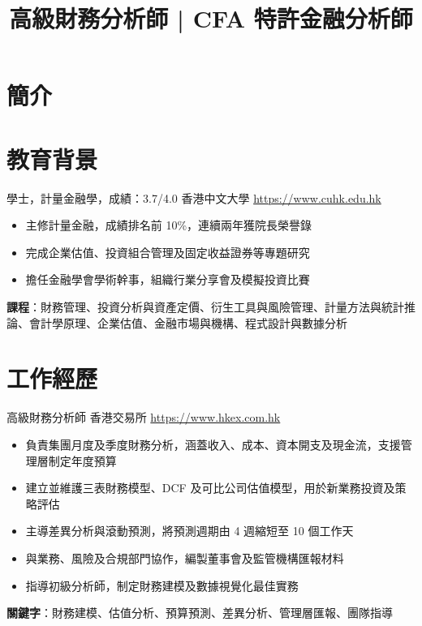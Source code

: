 \documentclass[a4paper, serif, 10pt]{moderncv}
\title{高級財務分析師 | CFA 特許金融分析師}
\begin{document}
\maketitle

\section{簡介}

\section{教育背景}

        {學士，計量金融學，成績：3.7/4.0}
        {香港中文大學}
        {\url{https://www.cuhk.edu.hk}}
        {}
        {\begin{itemize}
\item 主修計量金融，成績排名前 10\%，連續兩年獲院長榮譽錄
\item 完成企業估值、投資組合管理及固定收益證券等專題研究
\item 擔任金融學會學術幹事，組織行業分享會及模擬投資比賽
\end{itemize}
\textbf{課程}：財務管理、投資分析與資產定價、衍生工具與風險管理、計量方法與統計推論、會計學原理、企業估值、金融市場與機構、程式設計與數據分析}
\section{工作經歷}

        {高級財務分析師}
        {香港交易所}
        {\url{https://www.hkex.com.hk}}
        {}
        {\begin{itemize}
\item 負責集團月度及季度財務分析，涵蓋收入、成本、資本開支及現金流，支援管理層制定年度預算
\item 建立並維護三表財務模型、DCF 及可比公司估值模型，用於新業務投資及策略評估
\item 主導差異分析與滾動預測，將預測週期由 4 週縮短至 10 個工作天
\item 與業務、風險及合規部門協作，編製董事會及監管機構匯報材料
\item 指導初級分析師，制定財務建模及數據視覺化最佳實務
\end{itemize}
\textbf{關鍵字}：財務建模、估值分析、預算預測、差異分析、管理層匯報、團隊指導}
\end{document}
